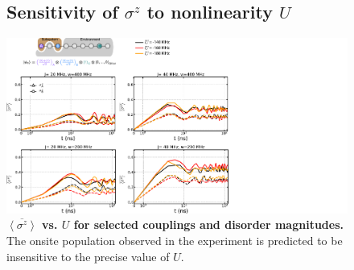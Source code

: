 \begin{figure}[h]
\subsection{Sensitivity of $\sigma^z$ to nonlinearity $U$}
\centering
\hspace*{20 mm}
\includegraphics[width=200mm, keepaspectratio]{./PDF/eta_ziiz.pdf}
\caption{\textbf{$\overline{\left< \sigma^z \right>}$ vs. $U$ for selected couplings and disorder magnitudes.}
The onsite population observed in the experiment is predicted to be insensitive to the precise value of $U$.}

\end{figure}

